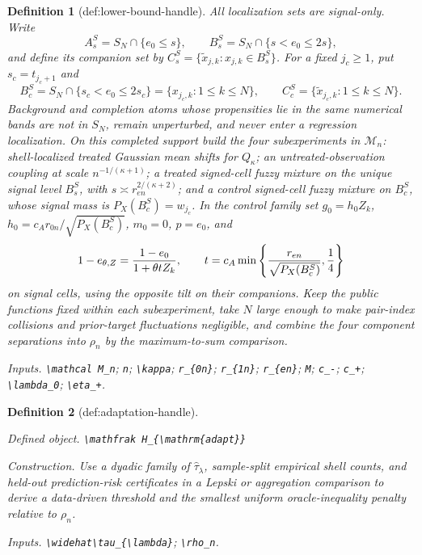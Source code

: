 \documentclass{article}
\newtheorem{definition}{Definition}
\begin{document}
\begin{definition}[def:lower-bound-handle]
All localization sets are signal-only.  Write
\[
A_s^S=S_N\cap\{e_0\leq s\},\quad\quad
B_s^S=S_N\cap\{s<e_0\leq2s\},
\]
and define its companion set by
\(C_s^S=\{\widetilde x_{j,k}:x_{j,k}\in B_s^S\}\).  For a fixed
\(j_c\geq1\), put \(s_c=t_{j_c+1}\) and
\[
B_c^S=S_N\cap\{s_c<e_0\leq2s_c\}
=\{x_{j_c,k}:1\leq k\leq N\},\quad\quad
C_c^S=\{\widetilde x_{j_c,k}:1\leq k\leq N\}.
\]
Background and completion atoms whose propensities lie in the same numerical
bands are not in \(S_N\), remain unperturbed, and never enter a regression
localization.  On this completed support build the four subexperiments in
\(\mathcal M_n\): shell-localized treated Gaussian mean shifts for
\(Q_\kappa\); an untreated-observation coupling at scale
\(n^{-1/(\kappa+1)}\); a treated signed-cell fuzzy mixture on the unique signal
level \(B_s^S\), with \(s\asymp r_{en}^{2/(\kappa+2)}\); and a control
signed-cell fuzzy mixture on \(B_c^S\), whose signal mass is
\(P_X(B_c^S)=w_{j_c}\).  In the control family set
\(g_0=h_0Z_k\), \(h_0=c_A r_{0n}/\sqrt{P_X(B_c^S)}\), \(m_0=0\), \(p=e_0\),
and
\[
1-e_{\theta,Z}={1-e_0\over1+\theta tZ_k},\quad\quad
t=c_A\min\left\{{r_{en}\over\sqrt{P_X(B_c^S)}},{1\over4}\right\}
\]
on signal cells, using the opposite tilt on their companions.  Keep the public
functions fixed within each subexperiment, take \(N\) large enough to make
pair-index collisions and prior-target fluctuations negligible, and combine
the four component separations into \(\rho_n\) by the maximum-to-sum comparison.
\par\smallskip\noindent\emph{Inputs.} \texttt{\textbackslash{}\allowbreak{}mathcal M\_\allowbreak{}n}; \texttt{n}; \texttt{\textbackslash{}\allowbreak{}kappa}; \texttt{r\_\allowbreak{}\{0n\}\allowbreak{}}; \texttt{r\_\allowbreak{}\{1n\}\allowbreak{}}; \texttt{r\_\allowbreak{}\{en\}\allowbreak{}}; \texttt{M}; \texttt{c\_\allowbreak{}-\allowbreak{}}; \texttt{c\_\allowbreak{}+\allowbreak{}}; \texttt{\textbackslash{}\allowbreak{}lambda\_\allowbreak{}0}; \texttt{\textbackslash{}\allowbreak{}eta\_\allowbreak{}+\allowbreak{}}.
\end{definition}

\begin{definition}[def:adaptation-handle]\label{def:adaptation-handle}
\par\smallskip\noindent\emph{Defined object.} \texttt{\textbackslash{}\allowbreak{}mathfrak H\_\allowbreak{}\{\textbackslash{}\allowbreak{}mathrm\{adapt\}\allowbreak{}\}\allowbreak{}}
\par\smallskip\noindent\emph{Construction.} Use a dyadic family of \(\widehat\tau_{\lambda}\), sample-split empirical shell counts, and held-out prediction-risk certificates in a Lepski or aggregation comparison to derive a data-driven threshold and the smallest uniform oracle-inequality penalty relative to \(\rho_n\).
\par\smallskip\noindent\emph{Inputs.} \texttt{\textbackslash{}\allowbreak{}widehat\textbackslash{}\allowbreak{}tau\_\allowbreak{}\{\textbackslash{}\allowbreak{}lambda\}\allowbreak{}}; \texttt{\textbackslash{}\allowbreak{}rho\_\allowbreak{}n}.
\end{definition}
\end{document}
